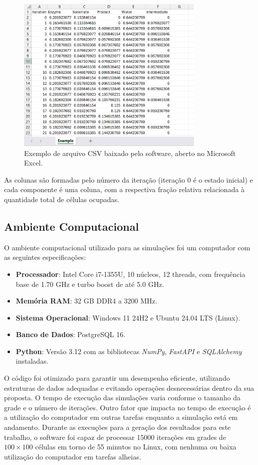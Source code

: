 \documentclass[12pt,oneside]{report}
\begin{document}
\begin{figure}[H]
    \centering
    \includegraphics[width=0.8\textwidth]{img/example_csv.png}
    \caption{\small Exemplo de arquivo CSV baixado pelo software, aberto no Microsoft Excel.}
    \label{fig:interface_simulacao_download}
\end{figure}

As colunas são formadas pelo número da iteração (iteração 0 é o estado inicial) e cada componente é uma coluna, com a respectiva fração relativa relacionada à quantidade total de células ocupadas.

\subsection{Ambiente Computacional}

O ambiente computacional utilizado para as simulações foi um computador com as seguintes especificações:
\begin{itemize}
    \item \textbf{Processador}: Intel Core i7-1355U, 10 núcleos, 12 threads, com frequência base de 1.70 GHz e turbo boost de até 5.0 GHz.
    \item \textbf{Memória RAM}: 32 GB DDR4 a 3200 MHz.
    \item \textbf{Sistema Operacional}: Windows 11 24H2 e Ubuntu 24.04 LTS (Linux).
    \item \textbf{Banco de Dados}: PostgreSQL 16.
    \item \textbf{Python}: Versão 3.12 com as bibliotecas \textit{NumPy}, \textit{FastAPI} e \textit{SQLAlchemy} instaladas.
\end{itemize}

O código foi otimizado para garantir um desempenho eficiente, utilizando estruturas de dados adequadas e evitando operações desnecessárias dentro da sua proposta. O tempo de execução das simulações varia conforme o tamanho da grade e o número de iterações. Outro fator que impacta no tempo de execução é a utilização do computador em outras tarefas enquanto a simulação está em andamento. Durante as execuções para a geração dos resultados para este trabalho, o software foi capaz de processar 15000 iterações em grades de $100 \times 100$ células em torno de 55 minutos no Linux, com nenhuma ou baixa utilização do computador em tarefas alheias.
\end{document}
